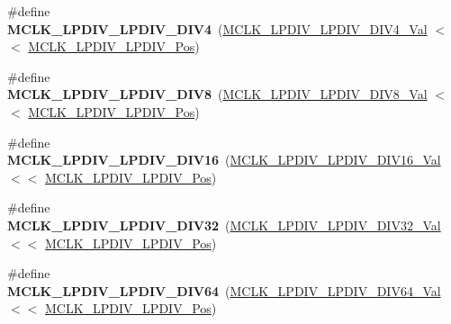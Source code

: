 \begin{DoxyCompactItemize}
\item 
\hypertarget{group___s_a_m_l21___m_c_l_k_ga33c81c235eaff5b9d807aded67a1b669}{}\#define {\bfseries M\+C\+L\+K\+\_\+\+L\+P\+D\+I\+V\+\_\+\+L\+P\+D\+I\+V\+\_\+\+D\+I\+V4}~(\hyperlink{group___s_a_m_l21___m_c_l_k_ga5e716c7a9dbe745b4da5fc7921452a6a}{M\+C\+L\+K\+\_\+\+L\+P\+D\+I\+V\+\_\+\+L\+P\+D\+I\+V\+\_\+\+D\+I\+V4\+\_\+\+Val}     $<$$<$ \hyperlink{group___s_a_m_l21___m_c_l_k_gad9275e73d38bc33c74fe1d10e17e0023}{M\+C\+L\+K\+\_\+\+L\+P\+D\+I\+V\+\_\+\+L\+P\+D\+I\+V\+\_\+\+Pos})\label{group___s_a_m_l21___m_c_l_k_ga33c81c235eaff5b9d807aded67a1b669}

\item 
\hypertarget{group___s_a_m_l21___m_c_l_k_ga0d6a94f7f18e9e421febb1e427f9b830}{}\#define {\bfseries M\+C\+L\+K\+\_\+\+L\+P\+D\+I\+V\+\_\+\+L\+P\+D\+I\+V\+\_\+\+D\+I\+V8}~(\hyperlink{group___s_a_m_l21___m_c_l_k_ga03b73cc67f8190dd558d476a0bffca16}{M\+C\+L\+K\+\_\+\+L\+P\+D\+I\+V\+\_\+\+L\+P\+D\+I\+V\+\_\+\+D\+I\+V8\+\_\+\+Val}     $<$$<$ \hyperlink{group___s_a_m_l21___m_c_l_k_gad9275e73d38bc33c74fe1d10e17e0023}{M\+C\+L\+K\+\_\+\+L\+P\+D\+I\+V\+\_\+\+L\+P\+D\+I\+V\+\_\+\+Pos})\label{group___s_a_m_l21___m_c_l_k_ga0d6a94f7f18e9e421febb1e427f9b830}

\item 
\hypertarget{group___s_a_m_l21___m_c_l_k_ga4e890af8896b8c1d13be12c5333948f5}{}\#define {\bfseries M\+C\+L\+K\+\_\+\+L\+P\+D\+I\+V\+\_\+\+L\+P\+D\+I\+V\+\_\+\+D\+I\+V16}~(\hyperlink{group___s_a_m_l21___m_c_l_k_gae8321fe2a5533dd1a11004517f41e489}{M\+C\+L\+K\+\_\+\+L\+P\+D\+I\+V\+\_\+\+L\+P\+D\+I\+V\+\_\+\+D\+I\+V16\+\_\+\+Val}    $<$$<$ \hyperlink{group___s_a_m_l21___m_c_l_k_gad9275e73d38bc33c74fe1d10e17e0023}{M\+C\+L\+K\+\_\+\+L\+P\+D\+I\+V\+\_\+\+L\+P\+D\+I\+V\+\_\+\+Pos})\label{group___s_a_m_l21___m_c_l_k_ga4e890af8896b8c1d13be12c5333948f5}

\item 
\hypertarget{group___s_a_m_l21___m_c_l_k_ga84e01334c1e689a7850144327aba471e}{}\#define {\bfseries M\+C\+L\+K\+\_\+\+L\+P\+D\+I\+V\+\_\+\+L\+P\+D\+I\+V\+\_\+\+D\+I\+V32}~(\hyperlink{group___s_a_m_l21___m_c_l_k_ga8e43281ced7f337fcb3969549fc20758}{M\+C\+L\+K\+\_\+\+L\+P\+D\+I\+V\+\_\+\+L\+P\+D\+I\+V\+\_\+\+D\+I\+V32\+\_\+\+Val}    $<$$<$ \hyperlink{group___s_a_m_l21___m_c_l_k_gad9275e73d38bc33c74fe1d10e17e0023}{M\+C\+L\+K\+\_\+\+L\+P\+D\+I\+V\+\_\+\+L\+P\+D\+I\+V\+\_\+\+Pos})\label{group___s_a_m_l21___m_c_l_k_ga84e01334c1e689a7850144327aba471e}

\item 
\hypertarget{group___s_a_m_l21___m_c_l_k_gad8294dc01ed3bfcb136d6f4436bbf2ea}{}\#define {\bfseries M\+C\+L\+K\+\_\+\+L\+P\+D\+I\+V\+\_\+\+L\+P\+D\+I\+V\+\_\+\+D\+I\+V64}~(\hyperlink{group___s_a_m_l21___m_c_l_k_gac4fb37777ca79177c4978c771ee1aa5c}{M\+C\+L\+K\+\_\+\+L\+P\+D\+I\+V\+\_\+\+L\+P\+D\+I\+V\+\_\+\+D\+I\+V64\+\_\+\+Val}    $<$$<$ \hyperlink{group___s_a_m_l21___m_c_l_k_gad9275e73d38bc33c74fe1d10e17e0023}{M\+C\+L\+K\+\_\+\+L\+P\+D\+I\+V\+\_\+\+L\+P\+D\+I\+V\+\_\+\+Pos})\label{group___s_a_m_l21___m_c_l_k_gad8294dc01ed3bfcb136d6f4436bbf2ea}


\end{DoxyCompactItemize}
